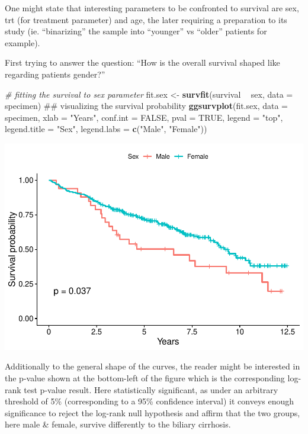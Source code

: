 \documentclass[]{article}
\newenvironment{Shaded}{\begin{snugshade}}{\end{snugshade}}
\newcommand{\KeywordTok}[1]{\textcolor[rgb]{0.13,0.29,0.53}{\textbf{#1}}}
\newcommand{\DataTypeTok}[1]{\textcolor[rgb]{0.13,0.29,0.53}{#1}}
\newcommand{\StringTok}[1]{\textcolor[rgb]{0.31,0.60,0.02}{#1}}
\newcommand{\CommentTok}[1]{\textcolor[rgb]{0.56,0.35,0.01}{\textit{#1}}}
\newcommand{\OtherTok}[1]{\textcolor[rgb]{0.56,0.35,0.01}{#1}}
\newcommand{\OperatorTok}[1]{\textcolor[rgb]{0.81,0.36,0.00}{\textbf{#1}}}
\newcommand{\NormalTok}[1]{#1}
\begin{document}
One might state that interesting parameters to be confronted to survival
are sex, trt (for treatment parameter) and age, the later requiring a
preparation to its study (ie. ``binarizing'' the sample into ``younger''
vs ``older'' patients for example).

First trying to answer the question: ``How is the overall survival
shaped like regarding patients gender?''

\begin{Shaded}
\begin{Highlighting}[]
\CommentTok{# fitting the survival to sex parameter}
\NormalTok{fit.sex <-}\StringTok{ }\KeywordTok{survfit}\NormalTok{(survival }\OperatorTok{~}\StringTok{ }\NormalTok{sex, }\DataTypeTok{data =}\NormalTok{ specimen)}
\NormalTok{## visualizing the survival probability}
\KeywordTok{ggsurvplot}\NormalTok{(fit.sex, }
           \DataTypeTok{data =}\NormalTok{ specimen, }
           \DataTypeTok{xlab =} \StringTok{"Years"}\NormalTok{,}
           \DataTypeTok{conf.int =} \OtherTok{FALSE}\NormalTok{,}
           \DataTypeTok{pval =} \OtherTok{TRUE}\NormalTok{,}
           \DataTypeTok{legend =} \StringTok{"top"}\NormalTok{,}
           \DataTypeTok{legend.title =} \StringTok{"Sex"}\NormalTok{,}
           \DataTypeTok{legend.labs =} \KeywordTok{c}\NormalTok{(}\StringTok{"Male"}\NormalTok{, }\StringTok{"Female"}\NormalTok{))}
\end{Highlighting}
\end{Shaded}

\includegraphics{report_files/figure-latex/unnamed-chunk-10-1.pdf}

Additionally to the general shape of the curves, the reader might be
interested in the p-value shown at the bottom-left of the figure which
is the corresponding log-rank test p-value result. Here statistically
significant, as under an arbitrary threshold of 5\% (corresponding to a
95\% confidence interval) it conveys enough significance to reject the
log-rank null hypothesis and affirm that the two groups, here male \&
female, survive differently to the biliary cirrhosis.
\end{document}
